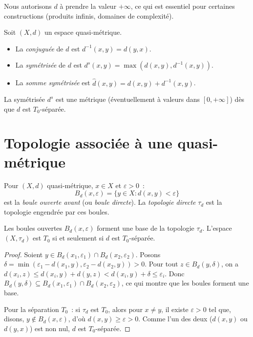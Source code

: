 \begin{remarque}
Nous autorisons $d$ \`a prendre la valeur $+\infty$, ce qui est essentiel pour certaines
constructions (produits infinis, domaines de complexit\'e).
\end{remarque}

\begin{definition}
Soit $(X,d)$ un espace quasi-m\'etrique.
\begin{itemize}
  \item La \emph{conjugu\'ee} de $d$ est $d^{-1}(x,y) = d(y,x)$.
  \item La \emph{sym\'etris\'ee} de $d$ est $d^s(x,y) = \max(d(x,y), d^{-1}(x,y))$.
  \item La \emph{somme sym\'etris\'ee} est $\hat{d}(x,y) = d(x,y) + d^{-1}(x,y)$.
\end{itemize}
La sym\'etris\'ee $d^s$ est une m\'etrique (\'eventuellement \`a valeurs dans $[0,+\infty]$)
d\`es que $d$ est $T_0$-s\'epar\'ee.
\end{definition}

\section{Topologie associ\'ee \`a une quasi-m\'etrique}

\begin{definition}
Pour $(X,d)$ quasi-m\'etrique, $x \in X$ et $\varepsilon > 0$~:
\[
  B_d(x,\varepsilon) = \{y \in X : d(x,y) < \varepsilon\}
\]
est la \emph{boule ouverte avant} (ou \emph{boule directe}).
La \emph{topologie directe} $\tau_d$ est la topologie engendr\'ee par ces boules.
\end{definition}

\begin{proposition}
Les boules ouvertes $B_d(x,\varepsilon)$ forment une base de la topologie $\tau_d$.
L'espace $(X, \tau_d)$ est $T_0$ si et seulement si $d$ est $T_0$-s\'epar\'ee.
\end{proposition}

\begin{proof}
Soient $y \in B_d(x_1,\varepsilon_1) \cap B_d(x_2,\varepsilon_2)$. Posons
$\delta = \min(\varepsilon_1 - d(x_1,y), \varepsilon_2 - d(x_2,y)) > 0$. Pour tout
$z \in B_d(y,\delta)$, on a $d(x_i,z) \leq d(x_i,y) + d(y,z) < d(x_i,y) + \delta \leq
\varepsilon_i$. Donc $B_d(y,\delta) \subseteq B_d(x_1,\varepsilon_1) \cap
B_d(x_2,\varepsilon_2)$, ce qui montre que les boules forment une base.

Pour la s\'eparation $T_0$~: si $\tau_d$ est $T_0$, alors pour $x \neq y$, il existe
$\varepsilon > 0$ tel que, disons, $y \notin B_d(x,\varepsilon)$, d'o\`u $d(x,y) \geq
\varepsilon > 0$. Comme l'un des deux ($d(x,y)$ ou $d(y,x)$) est non nul, $d$ est
$T_0$-s\'epar\'ee.
\end{proof}

